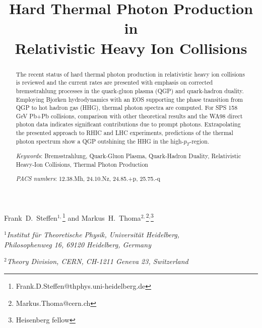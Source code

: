 \documentclass[12pt,twoside,fleqn]{article}
\begin{document}

\title{
\vspace*{-1cm}
{\normalsize{}}
{\normalsize{}}
{\normalsize{}}
\vspace*{1.cm}
{\Large\bf 
Hard Thermal Photon Production in\\ 
Relativistic Heavy Ion Collisions}}
\author{}
\date{}
\maketitle

\vspace*{-2.cm}

\begin{center}

\renewcommand{\thefootnote}{\alph{footnote}}

{\large
  Frank~D.~Steffen$^{1,}$\footnote{Frank.D.Steffen@thphys.uni-heidelberg.de} and
  Markus~H.~Thoma$^{2,}$\footnote{Markus.Thoma@cern.ch}$^{,}$\footnote{Heisenberg
    fellow}}

\vspace*{0.5cm}

{\it $^1$Institut f\"ur Theoretische Physik, Universit\"at Heidelberg,\\
Philosophenweg 16, 69120 Heidelberg, Germany}

\smallskip

{\it $^2$Theory Division, CERN, CH-1211 Geneva 23, Switzerland}

\end{center}

\bigskip


\begin{abstract}
  
  The recent status of hard thermal photon production in relativistic heavy ion
  collisions is reviewed and the current rates are presented with emphasis on
  corrected bremsstrahlung processes in the quark-gluon plasma (QGP) and
  quark-hadron duality. Employing Bjorken hydrodynamics with an EOS supporting
  the phase transition from QGP to hot hadron gas (HHG), thermal photon spectra
  are computed. For SPS 158 GeV Pb+Pb collisions, comparison with other
  theoretical results and the WA98 direct photon data indicates significant
  contributions due to prompt photons. Extrapolating the presented approach to
  RHIC and LHC experiments, predictions of the thermal photon spectrum show a
  QGP outshining the HHG in the high-$p_T$-region.

\vspace{1.cm}

\noindent
{\it Keywords}: Bremsstrahlung, Quark-Gluon Plasma, Quark-Hadron Duality,
Relativistic Heavy-Ion Collisions, Thermal Photon Production

\medskip

\noindent
{\it PACS numbers}: 12.38.Mh, 24.10.Nz, 24.85.+p, 25.75.-q 

\end{abstract}
\end{document}
